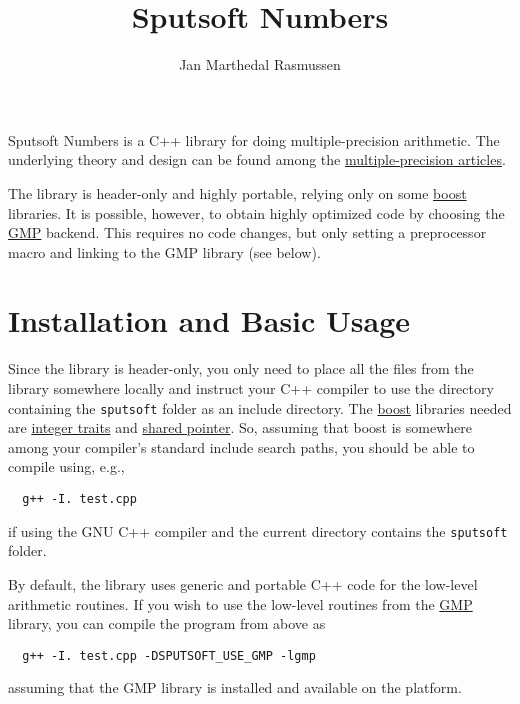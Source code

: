 \documentclass[a4paper]{article}
\begin{document}
\title{Sputsoft Numbers}
\author{Jan Marthedal Rasmussen}

\maketitle

Sputsoft Numbers is a C++ library for doing multiple-precision arithmetic. The underlying theory and design can be found among the \href{http://sputsoft.com/tag/multiple-precision/}{multiple-precision articles}.

The library is header-only and highly portable, relying only on some \href{http://www.boost.org}{boost} libraries. It is possible, however, to obtain highly optimized code by choosing the \href{http://gmplib.org/}{GMP} backend. This requires no code changes, but only setting a preprocessor macro and linking to the GMP library (see below).

\section{Installation and Basic Usage}

Since the library is header-only, you only need to place all the files from the library somewhere locally and instruct your C++ compiler to use the directory containing the \texttt{sputsoft} folder as an include directory. The \href{http://www.boost.org}{boost} libraries needed are \href{http://www.boost.org/doc/libs/1_43_0/libs/integer/doc/html/boost_integer/traits.html}{integer traits} and \href{http://www.boost.org/doc/libs/1_43_0/libs/smart_ptr/shared_ptr.htm}{shared pointer}. So, assuming that boost is somewhere among your compiler's standard include search paths, you should be able to compile using, e.g.,
\begin{verbatim}
  g++ -I. test.cpp
\end{verbatim}
if using the GNU C++ compiler and the current directory contains the \texttt{sputsoft} folder.

By default, the library uses generic and portable C++ code for the low-level arithmetic routines. If you wish to use the low-level routines from the \href{http://gmplib.org}{GMP} library, you can compile the program from above as
\begin{verbatim}
  g++ -I. test.cpp -DSPUTSOFT_USE_GMP -lgmp
\end{verbatim}
assuming that the GMP library is installed and available on the platform.
\end{document}
